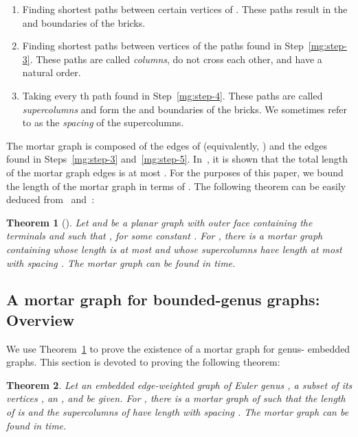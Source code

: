 \documentclass{article}
\newtheorem{theorem}{Theorem}
\begin{document}
\begin{enumerate} \item Finding shortest paths between certain vertices of .  These paths
  result in the  and  boundaries of the bricks.\label{mg:step-3}
\item Finding shortest paths between vertices of the paths found in
  Step~\ref{mg:step-3}.  These paths are called {\em columns}, do not
  cross each other, and have a natural order. \label{mg:step-4} 
\item
  Taking every th path found in Step~\ref{mg:step-4}.  These
  paths are called {\em supercolumns} and form the  and 
  boundaries of the bricks. We sometimes refer to  as the
  \emph{spacing} of the supercolumns.
  \label{mg:step-5} 
\end{enumerate} 

The mortar graph is composed of the edges of  (equivalently, )
and the edges found in Steps~\ref{mg:step-3} and~\ref{mg:step-5}.
In~\cite{BorradaileKM09}, it is shown that the total length of the
mortar graph edges is at most . For the purposes of this paper,
we bound the length of the mortar graph in terms of .  The
following theorem can be easily deduced from~\cite{Klein06}
and~\cite{BorradaileKM09}:

\begin{theorem}[\cite{Klein06,BorradaileKM09}] \label{thm:planar-mg}
  Let  and  be a planar graph with outer face
   containing the terminals  and such that
  , for some constant
  . For , there is a
  mortar graph  containing  whose
  length is at most  and whose supercolumns have length
  at most  with spacing .  The mortar graph can be
  found in  time.
\end{theorem} 

\subsection{A mortar graph for bounded-genus graphs: Overview}\label{sec:genus-mg}

We use Theorem~\ref{thm:planar-mg} to prove the existence of a mortar graph for
genus- embedded graphs. This section is devoted to
proving the following theorem: 

\begin{theorem}
  \label{thm:genus-mortar-graph} Let an embedded edge-weighted
  graph  of Euler genus , a subset of its vertices , an , and  be given. For , there is a mortar graph  of
   such that the length of  is  and the
  supercolumns of  have length  with spacing
  . The mortar
  graph can be found in  time.
\end{theorem}
\end{document}
